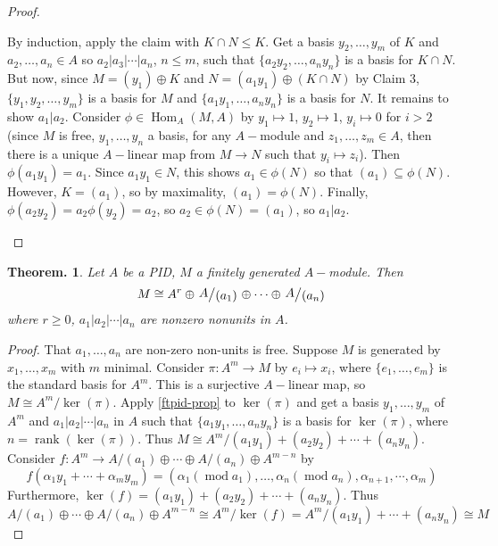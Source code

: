 \documentclass[11pt, a4paper]{memoir}
\theoremstyle{change}
\newtheorem{theorem}{Theorem.}[section]
\theoremstyle{plain}
\theoremstyle{nonumberplain}
\newtheorem{proof}{Proof}
\DeclareMathOperator{\Hom}{Hom}
\DeclareMathOperator{\rank}{rank}
\newcommand{\quot}[2]{\mathchoice{\left.\raisebox{0.10em}{$#1$}\middle/\raisebox{-0.10em}{$#2$}\right.}
                                 {\left.\raisebox{0.04em}{$#1$}\middle/\raisebox{-0.04em}{$#2$}\right.}
                                 {\left.\raisebox{0.01em}{$#1$}\middle/\raisebox{-0.01em}{$#2$}\right.}
                                 {\left.\raisebox{0em}{$#1$}\middle/\raisebox{0em}{$#2$}\right.}}
\numberwithin{equation}{section}
\begin{document}
\begin{proof}
\begin{enumerate}
            By induction, apply the claim with $K\cap N\leq K$.
            Get a basis $y_2,\ldots,y_m$ of $K$ and $a_2,\ldots,a_n\in A$ so $a_2|a_3|\cdots|a_n$, $n\leq m$, such that $\{a_2y_2,\ldots,a_ny_n\}$ is a basis for $K\cap N$.
            But now, since $M=(y_1)\oplus K$ and $N=(a_1y_1)\oplus(K\cap N)$ by Claim 3, $\{y_1,y_2,\ldots,y_m\}$ is a basis for $M$ and $\{a_1y_1,\ldots,a_ny_n\}$ is a basis for $N$.
            It remains to show $a_1|a_2$.
            Consider $\phi\in\Hom_A(M,A)$ by $y_1\mapsto 1$, $y_2\mapsto 1$, $y_i\mapsto 0$ for $i>2$ (since $M$ is free, $y_1,\ldots,y_n$ a basis, for any $A-$module and $z_1,\ldots,z_m\in A$, then there is a unique $A-$linear map from $M\to N$ such that $y_i\mapsto z_i$).
            Then $\phi(a_1y_1)=a_1$.
            Since $a_1y_1\in N$, this shows $a_1\in\phi(N)$ so that $(a_1)\subseteq\phi(N)$.
            However, $K=(a_1)$, so by maximality, $(a_1)=\phi(N)$.
            Finally, $\phi(a_2y_2)=a_2\phi(y_2)=a_2$, so $a_2\in\phi(N)=(a_1)$, so $a_1|a_2$.
    \end{enumerate}
\end{proof}
\begin{theorem}
    Let $A$ be a PID, $M$ a finitely generated $A-$module.
    Then
    \begin{equation*}
        M\cong A^r\oplus \quot{A}{(a_1)}\oplus\cdots\oplus \quot{A}{(a_n)}
    \end{equation*}
    where $r\geq 0$, $a_1|a_2|\cdots|a_n$ are nonzero nonunits in $A$.
\end{theorem}
\begin{proof}
    That $a_1,\ldots,a_n$ are non-zero non-units is free.
    Suppose $M$ is generated by $x_1,\ldots,x_m$ with $m$ minimal.
    Consider $\pi:A^m\to M$ by $e_i\mapsto x_i$, where $\{e_1,\ldots,e_m\}$ is the standard basis for $A^m$.
    This is a surjective $A-$linear map, so $M\cong A^m/\ker(\pi)$.
    Apply \cref{ftpid-prop} to $\ker(\pi)$ and get a basis $y_1,\ldots,y_m$ of $A^m$ and $a_1|a_2|\cdots|a_n$ in $A$ such that $\{a_1y_1,\ldots,a_ny_n\}$ is a basis for $\ker(\pi)$, where $n=\rank(\ker(\pi))$.
    Thus $M\cong A^m/(a_1y_1)+(a_2y_2)+\cdots+(a_ny_n)$.
    Consider $f:A^m\to A/(a_1)\oplus\cdots\oplus A/(a_n)\oplus A^{m-n}$ by
    \begin{equation*}
        f(\alpha_1y_1+\cdots+\alpha_m y_m)=(\alpha_1(\operatorname{mod}{a_1}),\ldots,\alpha_n(\operatorname{mod}{a_n}),\alpha_{n+1},\cdots,\alpha_m)
    \end{equation*}
    Furthermore, $\ker(f)=(a_1y_1)+(a_2y_2)+\cdots+(a_ny_n)$.
    Thus
    \begin{equation*}
        A/(a_1)\oplus\cdots\oplus A/(a_n)\oplus A^{m-n}\cong A^m/\ker(f)=A^m/(a_1y_1)+\cdots+(a_ny_n)\cong M
    \end{equation*}
\end{proof}
\end{document}
